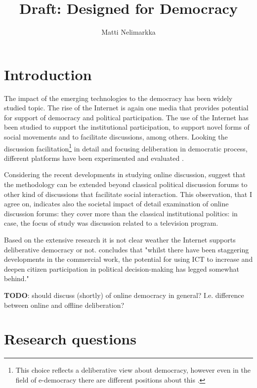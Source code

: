 \documentclass[journal,a4paper]{IEEEtran}
\author{Matti Nelimarkka}
\title{Draft: Designed for Democracy}
\begin{document}
\maketitle

\setlength{\parindent}{0pt}
\setlength{\parskip}{1ex}


\section{Introduction}

The impact of the emerging technologies to the democracy has been widely studied topic. The rise of the Internet is again one media that provides potential for support of democracy and political participation. The use of the Internet has been studied to support the institutional participation, to support novel forms of social movements and to facilitate discussions, among others. Looking the discussion facilitation\footnote{This choice reflects a deliberative view about democracy, however even in the field of e-democracy there are different positions about this .} in detail and focusing deliberation in democratic process, different platforms have been experimented  and evaluated .

Considering the recent developments in studying online discussion,  suggest that the methodology can be extended beyond classical political discussion forums to other kind of discussions that facilitate social interaction. This observation, that I agree on, indicates also the societal impact of detail examination of online discussion forums: they cover more than the classical institutional politics: in  case, the focus of study was discussion related to a television program.

Based on the extensive research it is not clear weather the Internet supports deliberative democracy or not.  concludes that "whilst there have been staggering developments in the commercial work, the potential for using ICT to increase and deepen citizen participation in political decision-making has legged somewhat behind."

\textbf{TODO}: should discuss (shortly) of online democracy in general? I.e. difference between online and offline deliberation?

\section{Research questions}
\end{document}
